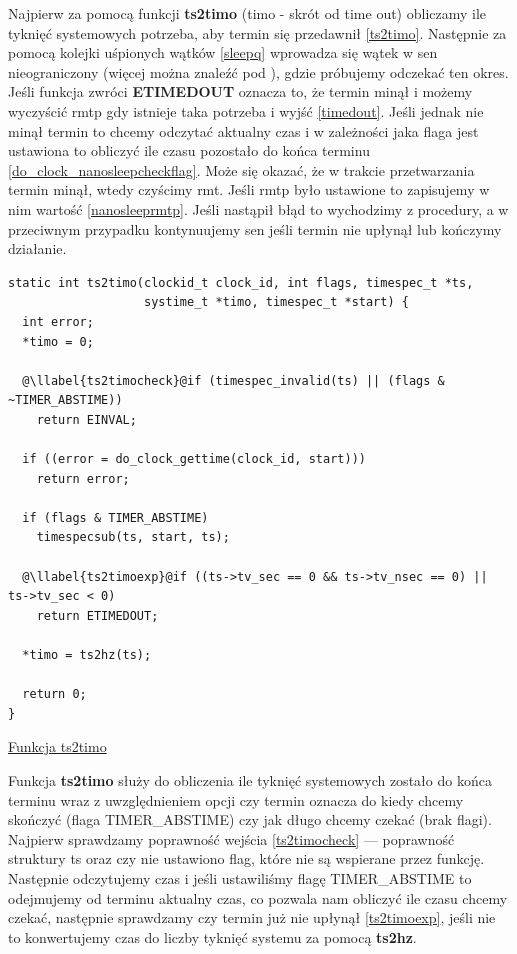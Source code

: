 \documentclass[shortabstract]{iithesis}
\makeatletter
\theoremstyle{definition} \newtheorem*{definition}{Definicja}
\theoremstyle{definition} \newtheorem*{example}{Przykład}
\theoremstyle{definition} \newtheorem*{remark}{Uwaga}
\newenvironment{longlisting}{\captionsetup{type=listing}}{}
\newcounter{llabel}[listing]%
\renewcommand*{\thellabel}{%
    \ifnum\value{llabel}<0 %
      \@ctrerr
    \else
      \ifnum\value{llabel}>10 %
        \@ctrerr
      \else
        \protect\ding{\the\numexpr\value{llabel}+201\relax}%
      \fi
    \fi
  }%
\newlength{\llabelsep}
\newcommand*{\llabel}[1]{%
  \begingroup
  \refstepcounter{llabel}%
  \label{#1}%
  \llap{\thellabel\kern\llabelsep}%
  \endgroup
}
\makeatother
\begin{document}
Najpierw za pomocą funkcji \textbf{ts2timo} (timo - skrót od time out) obliczamy ile tyknięć systemowych potrzeba, aby termin się przedawnił \ref{ts2timo}. Następnie za pomocą kolejki uśpionych wątków \ref{sleepq} wprowadza się wątek w sen nieograniczony (więcej można znaleźć pod \cite{bib:jpszcz}), gdzie próbujemy odczekać ten okres. Jeśli funkcja zwróci \textbf{ETIMEDOUT} oznacza to, że termin minął i możemy wyczyścić rmtp gdy istnieje taka potrzeba i wyjść \ref{timedout}. Jeśli jednak nie minął termin to chcemy odczytać aktualny czas i w zależności jaka flaga jest ustawiona to obliczyć ile czasu pozostało do końca terminu \ref{do_clock_nanosleepcheckflag}. Może się okazać, że w trakcie przetwarzania termin minął, wtedy czyścimy rmt. Jeśli rmtp było ustawione to zapisujemy w nim wartość \ref{nanosleeprmtp}. Jeśli nastąpił błąd to wychodzimy z procedury, a w przeciwnym przypadku kontynuujemy sen jeśli termin nie upłynął lub kończymy działanie.

\begin{longlisting}
  \begin{verbatim}
static int ts2timo(clockid_t clock_id, int flags, timespec_t *ts,
                   systime_t *timo, timespec_t *start) {
  int error;
  *timo = 0;

  @\llabel{ts2timocheck}@if (timespec_invalid(ts) || (flags & ~TIMER_ABSTIME))
    return EINVAL;

  if ((error = do_clock_gettime(clock_id, start)))
    return error;

  if (flags & TIMER_ABSTIME)
    timespecsub(ts, start, ts);

  @\llabel{ts2timoexp}@if ((ts->tv_sec == 0 && ts->tv_nsec == 0) || ts->tv_sec < 0)
    return ETIMEDOUT;

  *timo = ts2hz(ts);

  return 0;
}
  \end{verbatim}
  \caption{\href{https://mimiker.ii.uni.wroc.pl/source/xref/mimiker/sys/kern/time.c?r=9505a819\#56}{Funkcja ts2timo}}
  \label{lst:functs2timo}
\end{longlisting}

Funkcja \textbf{ts2timo} służy do obliczenia ile tyknięć systemowych zostało do końca terminu wraz z uwzględnieniem opcji czy termin oznacza do kiedy chcemy skończyć (flaga TIMER\_ABSTIME) czy jak długo chcemy czekać (brak flagi). Najpierw sprawdzamy poprawność wejścia \ref{ts2timocheck} --- poprawność struktury ts oraz czy nie ustawiono flag, które nie są wspierane przez funkcję. Następnie odczytujemy czas i jeśli ustawiliśmy flagę TIMER\_ABSTIME to odejmujemy od terminu aktualny czas, co pozwala nam obliczyć ile czasu chcemy czekać, następnie sprawdzamy czy termin już nie upłynął \ref{ts2timoexp}, jeśli nie to konwertujemy czas do liczby tyknięć systemu za pomocą \textbf{ts2hz}.
\end{document}
